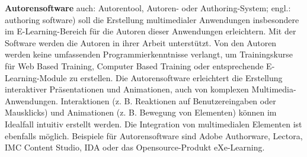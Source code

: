 \documentclass[a4paper, 12pt, twoside, BCOR=20mm, DIV=calc, abstracton, parskip=half*, toc=bibliography, toc=listof, headsepline, footsepline, headings=small, numbers=enddot]{scrreprt}
\begin{document}
	\textbf{Autorensoftware} auch: Autorentool, Autoren- oder Authoring-System; engl.: authoring software) soll die Erstellung multimedialer Anwendungen insbesondere im E-Learning-Bereich für die Autoren dieser Anwendungen erleichtern.
	Mit der Software werden die Autoren in ihrer Arbeit unterstützt. Von den Autoren werden keine umfassenden Programmierkenntnisse verlangt, um Trainingskurse für Web Based Training, Computer Based Training oder entsprechende E-Learning-Module zu erstellen.
	Die Autorensoftware erleichtert die Erstellung interaktiver Präsentationen und Animationen, auch von komplexen Multimedia-Anwendungen. Interaktionen (z. B. Reaktionen auf Benutzereingaben oder Mausklicks) und Animationen (z. B. Bewegung von Elementen) können im Idealfall intuitiv erstellt werden. Die Integration von multimedialen Elementen ist ebenfalls möglich.
	Beispiele für Autorensoftware sind Adobe Authorware, Lectora, IMC Content Studio, IDA oder das Opensource-Produkt eXe-Learning. %
	
\end{document}
